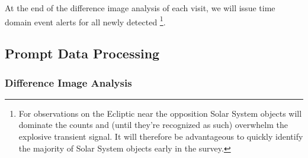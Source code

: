 \documentclass[SE,lsstdraft,toc]{lsstdoc}
\begin{document}
At the end of the difference image analysis of each visit, we will issue time domain event alerts for all newly %
detected \DIASources\footnote{For observations on the Ecliptic near the opposition Solar System objects will dominate the \DIASource counts and (until they're recognized as such) overwhelm the explosive transient signal. It will therefore be advantageous to quickly identify the majority of Solar System objects early in the survey.}.

\subsection{Prompt Data Processing}

\subsubsection{Difference Image Analysis}
\label{sec:dia}
\end{document}
